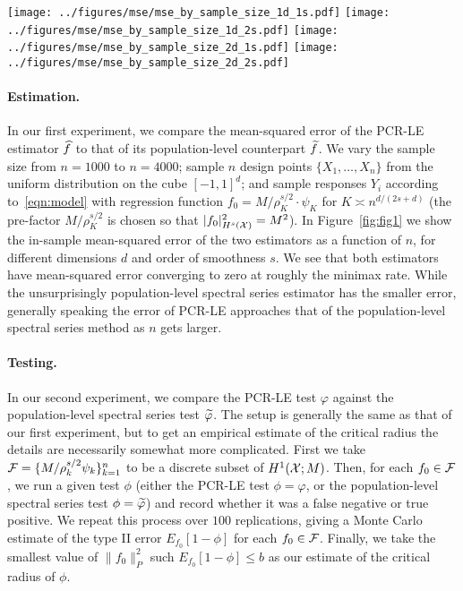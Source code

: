 \begin{figure*}[b]
	\texttt{[image: ../figures/mse/mse\_by\_sample\_size\_1d\_1s.pdf]}
	\texttt{[image: ../figures/mse/mse\_by\_sample\_size\_1d\_2s.pdf]}
	\texttt{[image: ../figures/mse/mse\_by\_sample\_size\_2d\_1s.pdf]}
	\texttt{[image: ../figures/mse/mse\_by\_sample\_size\_2d\_2s.pdf]}
	\caption{In-sample mean squared error (mse) of PCR-LE (\texttt{LE}) vs. population-level spectral series (\texttt{SS}) estimator, as a function of sample size $n$. Each plot is on the log-log scale, and the results are averaged over 400 repetitions. All estimators are tuned for optimal average mse, separately at each value of $n$. The black line shows the minimax rate (in slope only; the intercept is chosen to match the observed error).}
	\label{fig:fig1}
\end{figure*}

\paragraph{Estimation.}
In our first experiment, we compare the mean-squared error of the PCR-LE estimator $\widehat{f}$  to that of its population-level counterpart $\widetilde{f}$. We vary the sample size from $n = 1000$ to $n = 4000$; sample $n$ design points $\{X_1,\ldots,X_n\}$ from the uniform distribution on the cube $[-1,1]^d$; and sample responses $Y_i$ according to~\eqref{eqn:model} with regression function $f_0 = M/\rho_K^{s/2} \cdot \psi_K$ for $K \asymp n^{d/(2s + d)}$ (the pre-factor $M/\rho_K^{s/2}$ is chosen so that $|f_0|_{H^s(\mathcal{X})}^2 = M^2$). In Figure~\ref{fig:fig1} we show the in-sample mean-squared error of the two estimators as a function of $n$, for different dimensions $d$ and order of smoothness $s$. We see that both estimators have mean-squared error converging to zero at roughly the minimax rate. While the unsurprisingly population-level spectral series estimator has the smaller error, generally speaking the error of PCR-LE approaches that of the population-level spectral series method as $n$ gets larger. 

\paragraph{Testing.} 
In our second experiment, we compare the PCR-LE test $\varphi$ against the  population-level spectral series test $\widetilde{\varphi}$. The setup is generally the same as that of our first experiment, but to get an empirical estimate of the critical radius the details are necessarily somewhat more complicated. First we take $\mathcal{F} = \{M/\rho_k^{s/2} \psi_k\}_{k = 1}^{n}$ to be a discrete subset of $H^1(\mathcal{X};M)$. Then, for each $f_0 \in \mathcal{F}$, we run a given test $\phi$ (either the PCR-LE test $\phi = \varphi$, or the population-level spectral series test $\phi = \widetilde{\varphi}$) and record whether it was a false negative or true positive. We repeat this process over $100$ replications, giving a Monte Carlo estimate of the type II error $E_{f_0}[1 - \phi]$ for each $f_0 \in \mathcal{F}$. Finally, we take the smallest value of $\|f_0\|_P^2$ such $E_{f_0}[1 - \phi] \leq b$ as our estimate of the critical radius of $\phi$. 

